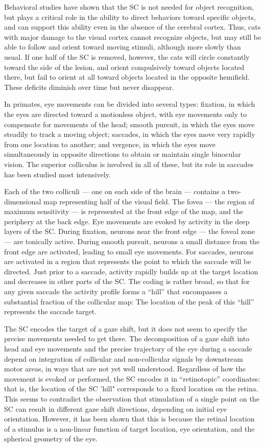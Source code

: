 Behavioral studies have shown that the SC is not needed for object recognition, but plays a critical role in the ability to direct behaviors toward specific objects, and can support this ability even in the absence of the cerebral cortex. Thus, cats with major damage to the visual cortex cannot recognize objects, but may still be able to follow and orient toward moving stimuli, although more slowly than usual. If one half of the SC is removed, however, the cats will circle constantly toward the side of the lesion, and orient compulsively toward objects located there, but fail to orient at all toward objects located in the opposite hemifield. These deficits diminish over time but never disappear.

In primates, eye movements can be divided into several types: fixation, in which the eyes are directed toward a motionless object, with eye movements only to compensate for movements of the head; smooth pursuit, in which the eyes move steadily to track a moving object; saccades, in which the eyes move very rapidly from one location to another; and vergence, in which the eyes move simultaneously in opposite directions to obtain or maintain single binocular vision. The superior colliculus is involved in all of these, but its role in saccades has been studied most intensively.

Each of the two colliculi --- one on each side of the brain --- contains a two-dimensional map representing half of the visual field. The fovea --- the region of maximum sensitivity --- is represented at the front edge of the map, and the periphery at the back edge. Eye movements are evoked by activity in the deep layers of the SC. During fixation, neurons near the front edge --- the foveal zone --- are tonically active. During smooth pursuit, neurons a small distance from the front edge are activated, leading to small eye movements. For saccades, neurons are activated in a region that represents the point to which the saccade will be directed. Just prior to a saccade, activity rapidly builds up at the target location and decreases in other parts of the SC. The coding is rather broad, so that for any given saccade the activity profile forms a ``hill'' that encompasses a substantial fraction of the collicular map: The location of the peak of this ``hill'' represents the saccade target.

The SC encodes the target of a gaze shift, but it does not seem to specify the precise movements needed to get there. The decomposition of a gaze shift into head and eye movements and the precise trajectory of the eye during a saccade depend on integration of collicular and non-collicular signals by downstream motor areas, in ways that are not yet well understood. Regardless of how the movement is evoked or performed, the SC encodes it in ``retinotopic'' coordinates: that is, the location of the SC 'hill" corresponds to a fixed location on the retina. This seems to contradict the observation that stimulation of a single point on the SC can result in different gaze shift directions, depending on initial eye orientation. However, it has been shown that this is because the retinal location of a stimulus is a non-linear function of target location, eye orientation, and the spherical geometry of the eye.

